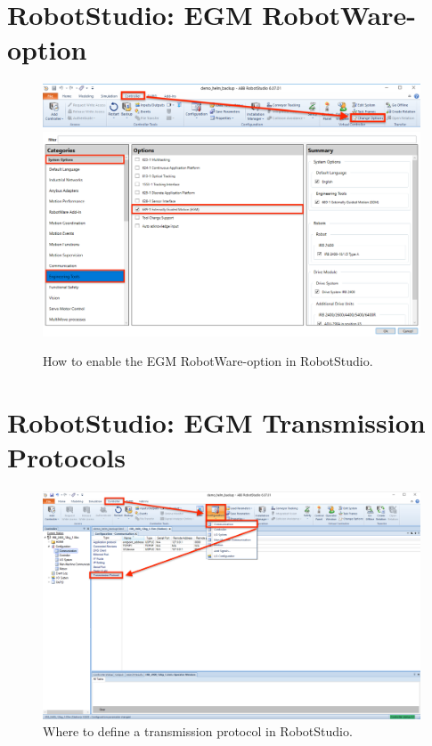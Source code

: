 \documentclass{cslthse-msc}
\begin{document}
\begin{appendices}
\section{RobotStudio: EGM RobotWare-option}
\label{app:Screenshots:EGM_in_controller}
\begin{figure}[H]
    \centering
    \includegraphics[width=12cm]{egm_controller_settings_mkup1.png}
    \includegraphics[width=12cm]{egm_controller_settings_mkup2.png}
    \caption{How to enable the EGM RobotWare-option in RobotStudio.}
    \label{fig:egm_option_enable}
\end{figure}

\section{RobotStudio: EGM Transmission Protocols}
\label{app:Screenshots:Trans_protocols}
\begin{figure}[H]
    \centering
    \includegraphics[width=12cm]{egm_trans_proto_lib_markup.png}
    \caption{Where to define a transmission protocol in RobotStudio.}
    \label{fig:egm_trans_proto}
\end{figure}


\end{appendices}
\end{document}
